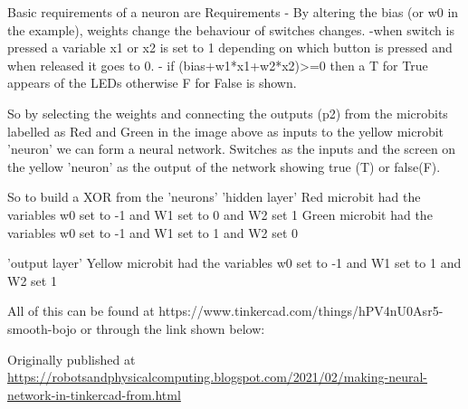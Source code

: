Basic requirements of a neuron are
Requirements 
- By altering the bias (or w0 in the example), weights change the behaviour of switches changes.
-when switch is pressed a variable x1 or x2 is set to 1 depending on which button is pressed and when released it goes to 0. 
- if (bias+w1*x1+w2*x2)>=0 then a T for True appears of the LEDs otherwise F for False is shown.

So by selecting the weights and connecting the outputs (p2) from the microbits labelled as Red and Green in the image above as inputs to the yellow microbit 'neuron' we can form a neural network. Switches as the inputs and the screen on the yellow 'neuron' as the output of the network showing true (T) or false(F).

So to build a XOR from the 'neurons'
'hidden layer'
Red microbit had the variables w0 set to -1 and W1 set to 0 and W2 set 1
Green microbit had the variables w0 set to -1 and W1 set to 1 and W2 set 0

'output layer'
Yellow microbit had the variables w0 set to -1 and W1 set to 1 and W2 set 1

All of this can be found at https://www.tinkercad.com/things/hPV4nU0Asr5-smooth-bojo or through the link shown below:

Originally published at \url{https://robotsandphysicalcomputing.blogspot.com/2021/02/making-neural-network-in-tinkercad-from.html}
